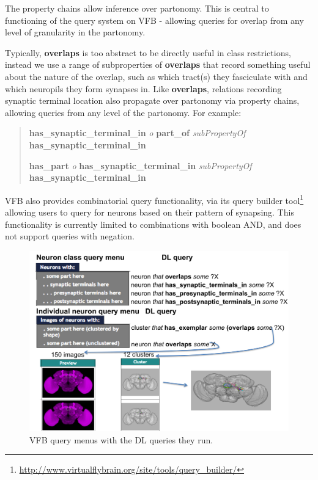 \documentclass[runningheads,a4paper]{llncs}
\begin{document}
The property chains allow inference over partonomy.  This is central
to functioning of the query system on VFB - allowing queries for
overlap from any level of granularity in the partonomy.

Typically, \textbf{overlaps} is too abstract to be directly useful in
class restrictions, instead we use a range of subproperties of
\textbf{overlaps} that record something useful about the nature of the
overlap, such as which tract(s) they fasciculate with and which
neuropils they form synapses in.  Like \textbf{overlaps}, relations
recording synaptic terminal location also propagate over partonomy via
property chains, allowing queries from any level of the partonomy.
For example:

\begin{quote}
\textbf{has\_synaptic\_terminal\_in} \textit{o} \textbf{part\_of} \textit{subPropertyOf} \textbf{has\_synaptic\_terminal\_in}

\textbf{has\_part} \textit{o} \textbf{has\_synaptic\_terminal\_in} \textit{subPropertyOf}
\textbf{has\_synaptic\_terminal\_in}
\end{quote}
 
VFB also provides combinatorial query functionality, via its
query builder tool\footnote{\url{http://www.virtualflybrain.org/site/tools/query_builder/}}
allowing users to query for neurons based on their pattern of
synapsing.  This functionality is currently limited to combinations
with boolean AND, and does not support queries with negation.


\begin{figure}
\centering
\includegraphics[width=120mm]{images/Query_menus_DL_images.png}
\caption{VFB query menus with the DL queries they run.}
\label{fig:Query_menus_DL_images}
\end{figure}
\end{document}
